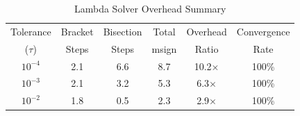 \begin{table}[t]
\centering
\caption{Lambda Solver Overhead Summary}
\label{tab:lambda_solver_summary}
\begin{tabular}{cccccc}
\toprule
Tolerance & Bracket & Bisection & Total & Overhead & Convergence \\
($\tau$) & Steps & Steps & msign & Ratio & Rate \\
\midrule
$10^{-4}$ & 2.1 & 6.6 & 8.7 & 10.2$\times$ & 100\% \\
$10^{-3}$ & 2.1 & 3.2 & 5.3 & 6.3$\times$ & 100\% \\
$10^{-2}$ & 1.8 & 0.5 & 2.3 & 2.9$\times$ & 100\% \\
\bottomrule
\end{tabular}
\end{table}